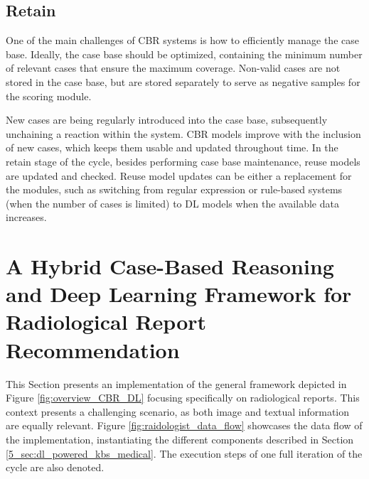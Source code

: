 \subsection{Retain}\label{5_sec:dl_powered_cbr_retain}
One of the main challenges of CBR systems is how to efficiently manage the case base. Ideally, the case base should be optimized, containing the minimum number of relevant cases that ensure the maximum coverage. Non-valid cases are not stored in the case base, but are stored separately to serve as negative samples for the scoring module. 

New cases are being regularly introduced into the case base, subsequently unchaining a reaction within the system. CBR models improve with the inclusion of new cases, which keeps them usable and updated throughout time. In the retain stage of the cycle, besides performing case base maintenance, reuse models are updated and checked. Reuse model updates can be either a replacement for the modules, such as switching from regular expression or rule-based systems (when the number of cases is limited) to DL models when the available data increases. 

\section{A Hybrid Case-Based Reasoning and Deep Learning Framework for Radiological Report Recommendation}\label{5_sec:raidologist}

This Section presents an implementation of the general framework depicted in Figure \ref{fig:overview_CBR_DL} focusing specifically on radiological reports. This context presents a challenging scenario, as both image and textual information are equally relevant. Figure \ref{fig:raidologist_data_flow} showcases the data flow of the implementation, instantiating the different components described in Section \ref{5_sec:dl_powered_kbs_medical}. The execution steps of one full iteration of the cycle are also denoted.

